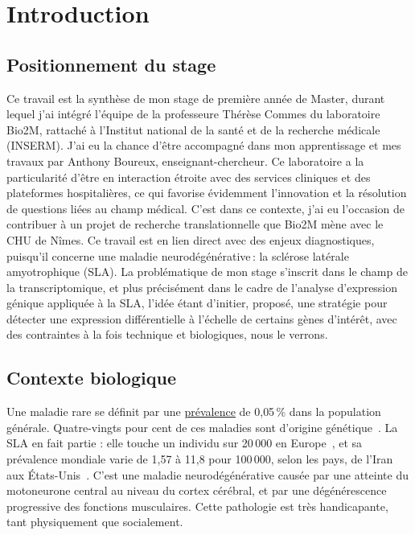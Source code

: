\section{Introduction}

\subsection{Positionnement du stage}

Ce travail est la synthèse de mon stage de première année de Master, durant lequel j'ai intégré l'équipe de la professeure Thérèse Commes du laboratoire Bio2M,
 rattaché à l’Institut national de la santé et de la recherche médicale (INSERM). J'ai eu la chance d'être accompagné dans mon apprentissage et mes travaux par Anthony Boureux, enseignant-chercheur.
Ce laboratoire a la particularité d'être en interaction étroite avec des services cliniques et des plateformes hospitalières, 
ce qui favorise évidemment l’innovation et la résolution de questions liées au champ médical.
C'est dans ce contexte, j'ai eu l’occasion de contribuer à un projet de recherche translationnelle que Bio2M mène avec le CHU de Nîmes. 
Ce travail est en lien direct avec des enjeux diagnostiques, puisqu’il concerne une maladie neurodégénérative : la sclérose latérale amyotrophique (SLA).
La problématique de mon stage s’inscrit dans le champ de la transcriptomique, et plus précisément dans le cadre de l’analyse d’expression génique appliquée à la SLA, 
l’idée étant d’initier, proposé, une stratégie pour détecter une expression différentielle à l’échelle de certains gènes d’intérêt, avec des contraintes à la fois technique et biologiques, nous le verrons.

\subsection{Contexte biologique}

Une maladie rare se définit par une \hyperref[def:prevalence]{prévalence} de 0{,}05\,\% dans la population générale.
 Quatre-vingts pour cent de ces maladies sont d’origine génétique~\textsuperscript{\cite{centre_constitutif_sla_de_tours_protocole_2020}}.
La SLA en fait partie : elle touche un individu sur 20\,000 en Europe~\textsuperscript{\cite{orphanet_prevalence_2023}}, et sa prévalence mondiale varie de 1{,}57 à 11{,}8 pour 100\,000,
selon les pays, de l’Iran aux États-Unis~\textsuperscript{\cite{c_wolfson_et_al_global_2023}}. C’est une maladie neurodégénérative causée par une atteinte du motoneurone central au niveau du cortex cérébral,
et par une dégénérescence progressive des fonctions musculaires. Cette pathologie est très handicapante, tant physiquement que socialement.

